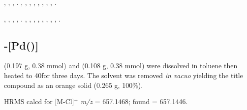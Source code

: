 ,
,
,
.
,
,
,
,
,
,
,
,
.

,
,
,
,
.
,
,
,
,
,
,
,
,
.

\subsection*{\trans{}-[Pd(\tButhixantphos)]}


\tBuThixantphos{} (0.197 g, 0.38 mmol) and \ce{[Pd(COD)Cl2]} (0.108 g, 0.38 mmol) were dissolved in toluene then heated to 40\degC for three days.  The solvent was removed \emph{in vacuo} yielding the title compound as an orange solid (0.265 g, 100\%).


HRMS calcd for  [M-Cl]$^+$ \emph{m/z} = 657.1468; found = 657.1446.

